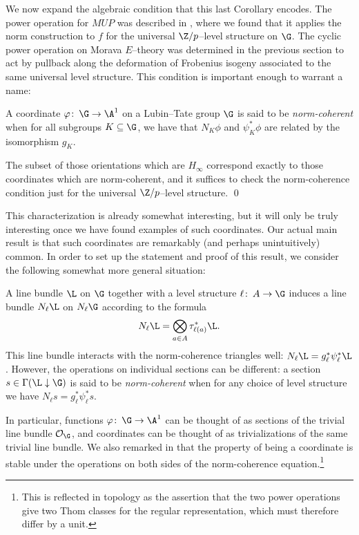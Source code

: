 We now expand the algebraic condition that this last Corollary encodes.  The power operation for \(MUP\) was described in , where we found that it applies the norm construction to \(f\) for the universal \(\Z/p\)--level structure on \(\G\).  The cyclic power operation on Morava \(E\)--theory was determined in the previous section to act by pullback along the deformation of Frobenius isogeny associated to the same universal level structure.  This condition is important enough to warrant a name:

\begin{definition}\label{NormCoherentDefn}
A coordinate \(\phi\co \G \to \A^1\) on a Lubin--Tate group \(\G\) is said to be \textit{norm-coherent} when for all subgroups \(K \subseteq \G\), we have that \(N_K \phi\) and \(\psi_K^* \phi\) are related by the isomorphism \(g_K\).
\end{definition}

\begin{corollary}
The subset of those orientations which are \(H_\infty\) correspond exactly to those coordinates which are norm-coherent, and it suffices to check the norm-coherence condition just for the universal \(\Z/p\)--level structure. \qed
\end{corollary}

This characterization is already somewhat interesting, but it will only be truly interesting once we have found examples of such coordinates.  Our actual main result is that such coordinates are remarkably (and perhaps unintuitively) common.  In order to set up the statement and proof of this result, we consider the following somewhat more general situation:

\begin{definition}
A line bundle \(\L\) on \(\G\) together with a level structure \(\ell\co A \to \G\) induces a line bundle \(N_\ell \L\) on \(N_\ell \G\) according to the formula \[N_\ell \L = \bigotimes_{a \in A} \tau_{\ell(a)}^* \L.\]  This line bundle interacts with the norm-coherence triangles well: \(N_\ell \L = g_\ell^* \psi_\ell^* \L\).  However, the operations on individual sections can be different: a section \(s \in \Gamma(\L \downarrow \G)\) is said to be \textit{norm-coherent} when for any choice of level structure we have \(N_\ell s = g_\ell^* \psi_\ell^* s\).
\end{definition}

\begin{example}
In particular, functions \(\phi\co \G \to \A^1\) can be thought of as sections of the trivial line bundle \(\sheaf O_{\G}\), and coordinates can be thought of as trivializations of the same trivial line bundle.  We also remarked in  that the property of being a coordinate is stable under the operations on both sides of the norm-coherence equation.\footnote{This is reflected in topology as the assertion that the two power operations give two Thom classes for the regular representation, which must therefore differ by a unit.}
\end{example}

